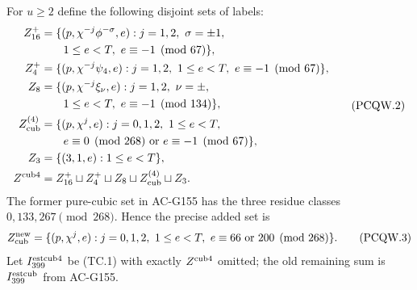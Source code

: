 For $u\geq2$ define the following disjoint sets of labels:
\[
 \begin{aligned}
 Z_{16}^+&=\{(p,\chi^{-j}\phi^{-\sigma},e):j=1,2,\ \sigma=\pm1,\\
 &\hspace{2em}1\leq e<T,\ e\equiv-1\pmod{67}\},\\
 Z_4^+&=\{(p,\chi^{-j}\psi_4,e):j=1,2,
       \ 1\leq e<T,\ e\equiv-1\pmod{67}\},\\
 Z_8&=\{(p,\chi^{-j}\xi_\nu,e):j=1,2,\ \nu=\pm,\\
 &\hspace{2em}1\leq e<T,\ e\equiv-1\pmod{134}\},\\
 Z_{\rm cub}^{(4)}&=\{(p,\chi^j,e):j=0,1,2,\ 1\leq e<T,\\
 &\hspace{2em}e\equiv0\pmod{268}\ \text{or}\ e\equiv-1\pmod{67}\},\\
 Z_3&=\{(3,1,e):1\leq e<T\},\\
 Z^{\rm cub4}&=Z_{16}^+\sqcup Z_4^+\sqcup Z_8
                                \sqcup Z_{\rm cub}^{(4)}\sqcup Z_3.
 \end{aligned}
 \tag{PCQW.2}
\]
The former pure-cubic set in AC-G155 has the three residue classes
$0,133,267\pmod{268}$.  Hence the precise added set is
\[
 Z_{\rm cub}^{\rm new}=\{(p,\chi^j,e):j=0,1,2,
             \ 1\leq e<T,\ e\equiv66\ \text{or}\ 200\pmod{268}\}.
 \tag{PCQW.3}
\]
Let $I_{399}^{\rm estcub4}$ be (TC.1) with exactly
$Z^{\rm cub4}$ omitted; the old remaining sum is
$I_{399}^{\rm estcub}$ from AC-G155.

